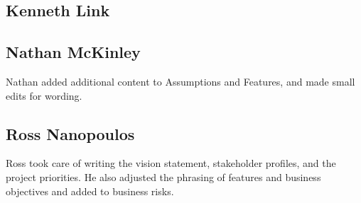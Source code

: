 \documentclass[letter]{scrartcl}
\begin{document}
\subsection{Kenneth Link}
\subsection{Nathan McKinley}
Nathan added additional content to Assumptions and Features, and made small edits for wording.
\subsection{Ross Nanopoulos}
\begin{description}
Ross took care of writing the vision statement, stakeholder profiles, and the project priorities.  He also adjusted the phrasing of features and business objectives and added to business risks.
\end{description}
\end{document}
